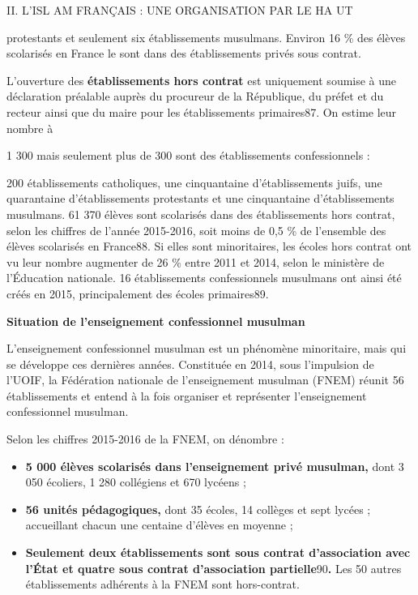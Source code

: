II. L'ISL AM FRANÇAIS : UNE ORGANISATION PAR LE HA UT

protestants et seulement six établissements musulmans. Environ 16 \% des
élèves scolarisés en France le sont dans des établissements privés sous
contrat.

L'ouverture des \textbf{établissements hors contrat} est uniquement
soumise à une déclaration préalable auprès du procureur de la
République, du préfet et du recteur ainsi que du maire pour les
établissements primaires87. On estime leur nombre à

1 300 mais seulement plus de 300 sont des établissements confessionnels
:

200 établissements catholiques, une cinquantaine d'établissements juifs,
une quarantaine d'établissements protestants et une cinquantaine
d'établissements musulmans. 61 370 élèves sont scolarisés dans des
établissements hors contrat, selon les chiffres de l'année 2015-2016,
soit moins de 0,5 \% de l'ensemble des élèves scolarisés en France88. Si
elles sont minoritaires, les écoles hors contrat ont vu leur nombre
augmenter de 26 \% entre 2011 et 2014, selon le ministère de l'Éducation
nationale. 16 établissements confessionnels musulmans ont ainsi été
créés en 2015, principalement des écoles primaires89.

\textbf{Situation de l'enseignement confessionnel musulman}

L'enseignement confessionnel musulman est un phénomène minoritaire, mais
qui se développe ces dernières années. Constituée en 2014, sous
l'impulsion de l'UOIF, la Fédération nationale de l'enseignement
musulman (FNEM) réunit 56 établissements et entend à la fois organiser
et représenter l'enseignement confessionnel musulman.

Selon les chiffres 2015-2016 de la FNEM, on dénombre :


\begin{itemize}
\item
  \textbf{5 000 élèves scolarisés dans l'enseignement privé musulman,}
  dont 3 050 écoliers, 1 280 collégiens et 670 lycéens ;
\item
  \textbf{56 unités pédagogiques,} dont 35 écoles, 14 collèges et sept
  lycées ; accueillant chacun une centaine d'élèves en moyenne ;
\end{itemize}

\begin{itemize}
\item
  \textbf{Seulement deux établissements sont sous contrat d'association
  avec l'État et quatre sous contrat d'association
  partielle}90\textbf{.} Les 50 autres établissements adhérents à la
  FNEM sont hors-contrat.
\end{itemize}


